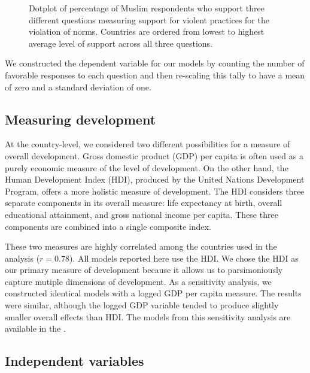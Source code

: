 \documentclass[10pt,letterpaper]{article}
\begin{document}
\begin{figure}[!h]
\centering
\caption{Dotplot of percentage of Muslim respondents who support three
different questions measuring support for violent practices for the
violation of norms. Countries are ordered from lowest to highest average
level of support across all three questions.}
\label{fig2}
\end{figure}

We constructed the dependent variable for our models by counting the
number of favorable responses to each question and then re-scaling this
tally to have a mean of zero and a standard deviation of one.

\subsection*{Measuring development}

At the country-level, we considered two different possibilities for a
measure of overall development. Gross domestic product (GDP) per capita
is often used as a purely economic measure of the level of development.
On the other hand, the Human Development Index (HDI), produced by the
United Nations Development Program, offers a more holistic measure of
development. The HDI considers three separate components in its overall
measure: life expectancy at birth, overall educational attainment, and
gross national income per capita. These three components are combined
into a single composite index.

These two measures are highly correlated among the countries used in the
analysis (\(r=0.78\)). All models reported here use the HDI. We chose
the HDI as our primary measure of development because it allows us to
parsimoniously capture mutiple dimensions of development. As a
sensitivity analysis, we constructed identical models with a logged GDP
per capita measure. The results were similar, although the logged GDP
variable tended to produce slightly smaller overall effects than HDI.
The models from this sensitivity analysis are available in the
.

\subsection*{Independent variables}
\end{document}
